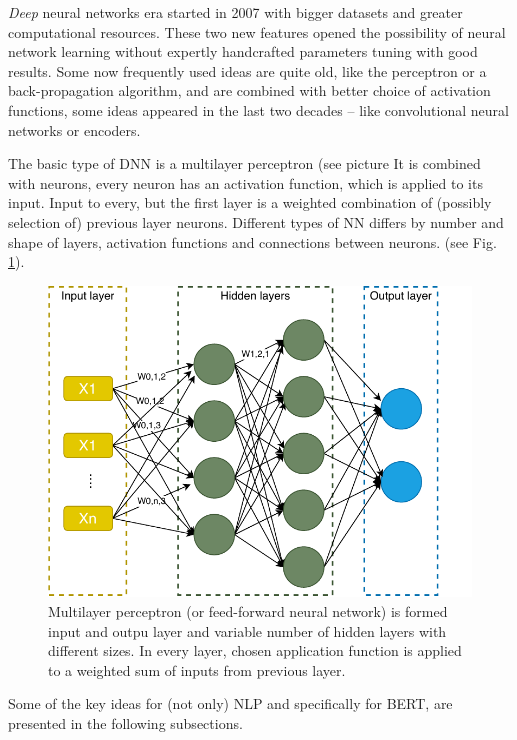 \par
\textit{Deep} neural networks era started in 2007 with bigger datasets and greater computational resources. These two new features opened the possibility of neural network learning without expertly handcrafted parameters tuning with good results.
Some now frequently used ideas are quite old, like the perceptron or a back-propagation algorithm, and are combined with better choice of activation functions, some ideas appeared in the last two decades -- like convolutional neural networks or encoders.
\par
The basic type of DNN is a multilayer perceptron (see picture %
It is combined with neurons, every neuron has an activation function, which is applied to its input. Input to every, but the first layer is a weighted combination of (possibly selection of) previous layer neurons. 
Different types of NN differs by number and shape of layers, activation functions and connections between neurons. (see Fig. \ref{pic:multilayer}).
\begin{figure}[ht]
\centering
\includegraphics[width=1\columnwidth]{../img/multilayer}
\caption{Multilayer perceptron (or feed-forward neural network) is formed input and outpu layer and variable number of hidden layers with different sizes. In every layer, chosen application function is applied to a weighted sum of inputs from previous layer.}
\label{pic:multilayer}
\end{figure}

Some of the key ideas for (not only) NLP and specifically for BERT, are presented in the following subsections.

